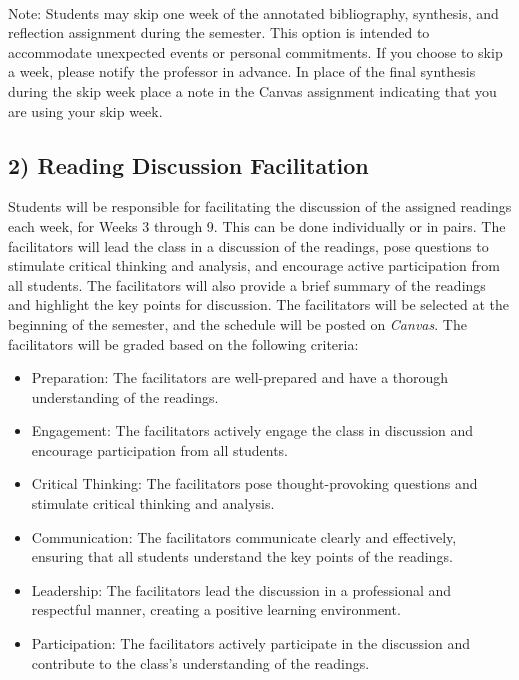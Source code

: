\documentclass[12pt, letterpaper]{article}
\begin{document}
\paragraph{} Note: Students may skip one week of the annotated bibliography, synthesis, and reflection assignment during the semester. This option is intended to accommodate unexpected events or personal commitments. If you choose to skip a week, please notify the professor in advance. In place of the final synthesis during the skip week place a note in the Canvas assignment indicating that you are using your skip week.

\subsection*{2) Reading Discussion Facilitation}
Students will be responsible for facilitating the discussion of the assigned readings each week, for Weeks 3 through 9. This can be done individually or in pairs. The facilitators will lead the class in a discussion of the readings, pose questions to stimulate critical thinking and analysis, and encourage active participation from all students. The facilitators will also provide a brief summary of the readings and highlight the key points for discussion. The facilitators will be selected at the beginning of the semester, and the schedule will be posted on \emph{Canvas}. The facilitators will be graded based on the following criteria:

\begin{itemize}
    \item Preparation: The facilitators are well-prepared and have a thorough understanding of the readings.
    \item Engagement: The facilitators actively engage the class in discussion and encourage participation from all students.
    \item Critical Thinking: The facilitators pose thought-provoking questions and stimulate critical thinking and analysis.
    \item Communication: The facilitators communicate clearly and effectively, ensuring that all students understand the key points of the readings.
    \item Leadership: The facilitators lead the discussion in a professional and respectful manner, creating a positive learning environment.
    \item Participation: The facilitators actively participate in the discussion and contribute to the class's understanding of the readings.
\end{itemize}
\end{document}

